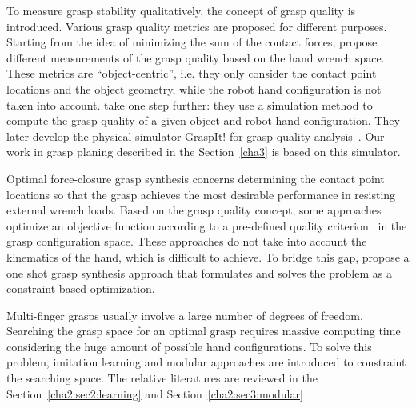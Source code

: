 To measure grasp stability qualitatively, the concept of grasp quality is introduced. Various grasp quality metrics are proposed for different purposes. Starting from the idea of minimizing the sum of the contact forces, \citep{li1988task,kirkpatrick1992quantitative, ferrari1992planning} propose different measurements of the grasp quality based on the hand wrench space.
These metrics are ``object-centric'', i.e. they only consider the contact point locations and the object geometry, while the robot hand configuration is not taken into account. \citet{miller1999examples} take one step further: they use a simulation method to compute the grasp quality of a given object and robot hand configuration. They later develop the physical simulator GraspIt! for grasp quality analysis~\citep{miller2004graspit}. Our work in grasp planing described in the Section~\ref{cha3} is based on this simulator.

Optimal force-closure grasp synthesis concerns determining the contact point locations so that the grasp achieves the most desirable performance in resisting external wrench loads.
Based on the grasp quality concept, some approaches optimize an objective function according to a pre-defined quality criterion~\citep{Zhu2003,Zhu04} in the grasp configuration space.
These approaches do not take into account the kinematics of the hand, which is difficult to achieve. To bridge this gap, \citet{S.ElKhoury2012} propose a one shot grasp synthesis approach that formulates and solves the problem as a constraint-based optimization.

Multi-finger grasps usually involve a large number of degrees of freedom.
Searching the grasp space for an optimal grasp requires massive computing time considering the huge amount of possible hand configurations. To solve this problem, imitation learning and modular approaches are introduced to constraint the searching space. The relative literatures are reviewed in the Section~\ref{cha2:sec2:learning} and Section~\ref{cha2:sec3:modular}

